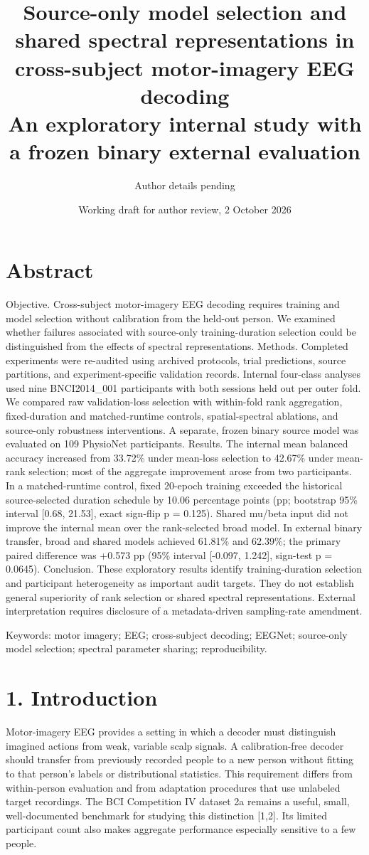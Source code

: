 \documentclass[11pt]{article}
\title{Source-only model selection and shared spectral representations in cross-subject motor-imagery EEG decoding\\\large An exploratory internal study with a frozen binary external evaluation}
\author{Author details pending}
\date{Working draft for author review, 2 October 2026}
\begin{document}
\maketitle
\section*{Abstract}
Objective. Cross-subject motor-imagery EEG decoding requires training and model selection without calibration from the held-out person. We examined whether failures associated with source-only training-duration selection could be distinguished from the effects of spectral representations. Methods. Completed experiments were re-audited using archived protocols, trial predictions, source partitions, and experiment-specific validation records. Internal four-class analyses used nine BNCI2014\_001 participants with both sessions held out per outer fold. We compared raw validation-loss selection with within-fold rank aggregation, fixed-duration and matched-runtime controls, spatial-spectral ablations, and source-only robustness interventions. A separate, frozen binary source model was evaluated on 109 PhysioNet participants. Results. The internal mean balanced accuracy increased from 33.72\% under mean-loss selection to 42.67\% under mean-rank selection; most of the aggregate improvement arose from two participants. In a matched-runtime control, fixed 20-epoch training exceeded the historical source-selected duration schedule by 10.06 percentage points (pp; bootstrap 95\% interval [0.68, 21.53], exact sign-flip p = 0.125). Shared mu/beta input did not improve the internal mean over the rank-selected broad model. In external binary transfer, broad and shared models achieved 61.81\% and 62.39\%; the primary paired difference was +0.573 pp (95\% interval [-0.097, 1.242], sign-test p = 0.0645). Conclusion. These exploratory results identify training-duration selection and participant heterogeneity as important audit targets. They do not establish general superiority of rank selection or shared spectral representations. External interpretation requires disclosure of a metadata-driven sampling-rate amendment.

Keywords: motor imagery; EEG; cross-subject decoding; EEGNet; source-only model selection; spectral parameter sharing; reproducibility.

\section*{1. Introduction}
Motor-imagery EEG provides a setting in which a decoder must distinguish imagined actions from weak, variable scalp signals. A calibration-free decoder should transfer from previously recorded people to a new person without fitting to that person's labels or distributional statistics. This requirement differs from within-person evaluation and from adaptation procedures that use unlabeled target recordings. The BCI Competition IV dataset 2a remains a useful, small, well-documented benchmark for studying this distinction [1,2]. Its limited participant count also makes aggregate performance especially sensitive to a few people.
\end{document}
